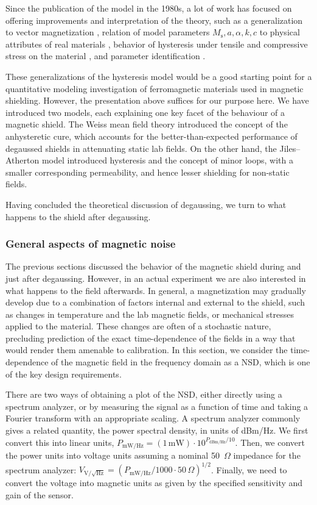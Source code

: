Since the publication of the model in the 1980s, a lot of work has focused on
offering improvements and interpretation of the theory, such as a generalization
to vector magnetization \cite{bergqvist1996simple}, relation of model parameters
$M_\text{s},a,\alpha,k,c$ to physical attributes of real materials
\cite{lewis1996modeling}, behavior of hysteresis under tensile and compressive
stress on the material \cite{sablik1987model}, and parameter identification
\cite{lederer1999parameter,leite2004real,fulginei2005softcomputing}.

These generalizations of the hysteresis model would be a good starting point for
a quantitative modeling investigation of ferromagnetic materials used in
magnetic shielding. However, the presentation above suffices for our
purpose here. We have introduced two models, each explaining one key facet
of the behaviour of a magnetic shield. The Weiss mean field theory
introduced the concept of the anhysteretic cure, which accounts for the
better-than-expected performance of degaussed shields in attenuating static lab
fields. On the other hand, the Jiles--Atherton model introduced hysteresis and
the concept of minor loops, with a smaller corresponding permeability, and hence
lesser shielding for non-static fields.

Having concluded the theoretical discussion of degaussing, we turn to what
happens to the shield after degaussing.

\subsubsection{General aspects of magnetic noise}

The previous sections discussed the behavior of the magnetic shield during and
just after degaussing. However, in an actual experiment we are also interested
in what happens to the field afterwards. In general, a magnetization may
gradually develop due to a combination of factors internal and external to the
shield, such as changes in temperature and the lab magnetic fields, or
mechanical stresses applied to the material. These changes are often of a
stochastic nature, precluding prediction of the exact time-dependence of the
fields in a way that would render them amenable to calibration. In this section,
we consider the time-dependence of the magnetic field in the frequency domain as
a \gls{NSD}, which is one of the key design requirements.

There are two ways of obtaining a plot of the \gls{NSD}, either directly using a
spectrum analyzer, or by measuring the signal as a function of time and taking a
Fourier transform with an appropriate scaling. A spectrum analyzer commonly
gives a related quantity, the power spectral density, in units of dBm/Hz. We
first convert this into linear units,
$P_\text{mW/Hz}=(1\,\text{mW})\cdot10^{P_\text{dBm/Hz}/10}$. Then, we convert
the power units into voltage units assuming a nominal 50~$\Omega$ impedance for
the spectrum analyzer:
$V_\mathrm{V/\sqrt{Hz}}=(P_\text{mW/Hz}/1000\cdot50\,\Omega)^{1/2}$. Finally, we
need to convert the voltage into magnetic units as given by the specified
sensitivity and gain of the sensor.

